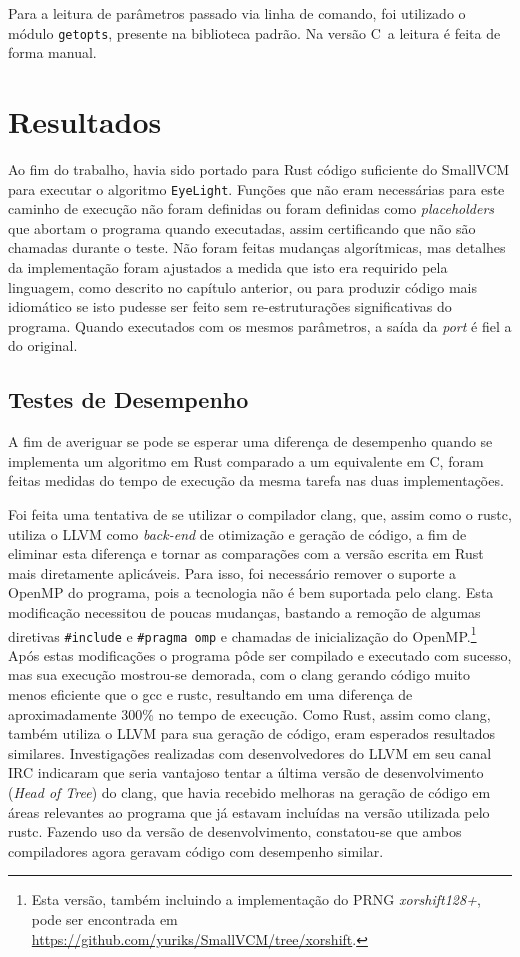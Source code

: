 \documentclass[tg]{mdtufsm}
\def\Cpp{{C\nolinebreak[4]\raisebox{.20ex}{\small\bf++}}}
\begin{document}
Para a leitura de parâmetros passado via linha de comando, foi utilizado o módulo \texttt{getopts}, presente na biblioteca padrão. Na versão \Cpp\ a leitura é feita de forma manual.

\chapter{Resultados}

Ao fim do trabalho, havia sido portado para Rust código suficiente do SmallVCM para executar o algoritmo \texttt{EyeLight}. Funções que não eram necessárias para este caminho de execução não foram definidas ou foram definidas como \emph{placeholders} que abortam o programa quando executadas, assim certificando que não são chamadas durante o teste. Não foram feitas mudanças algorítmicas, mas detalhes da implementação foram ajustados a medida que isto era requirido pela linguagem, como descrito no capítulo anterior, ou para produzir código mais idiomático se isto pudesse ser feito sem re-estruturações significativas do programa. Quando executados com os mesmos parâmetros, a saída da \emph{port} é fiel a do original.

\section{Testes de Desempenho}

A fim de averiguar se pode se esperar uma diferença de desempenho quando se implementa um algoritmo em Rust comparado a um equivalente em \Cpp, foram feitas medidas do tempo de execução da mesma tarefa nas duas implementações.

Foi feita uma tentativa de se utilizar o compilador clang, que, assim como o rustc, utiliza o LLVM como \emph{back-end} de otimização e geração de código, a fim de eliminar esta diferença e tornar as comparações com a versão escrita em Rust mais diretamente aplicáveis. Para isso, foi necessário remover o suporte a OpenMP do programa, pois a tecnologia não é bem suportada pelo clang. Esta modificação necessitou de poucas mudanças, bastando a remoção de algumas diretivas \texttt{\#include} e \texttt{\#pragma omp} e chamadas de inicialização do OpenMP.\footnote{Esta versão, também incluindo a implementação do PRNG \emph{xorshift128+}, pode ser encontrada em \url{https://github.com/yuriks/SmallVCM/tree/xorshift}.} Após estas modificações o programa pôde ser compilado e executado com sucesso, mas sua execução mostrou-se demorada, com o clang gerando código muito menos eficiente que o gcc e rustc, resultando em uma diferença de aproximadamente 300\% no tempo de execução. Como Rust, assim como clang, também utiliza o LLVM para sua geração de código, eram esperados resultados similares. Investigações realizadas com desenvolvedores do LLVM em seu canal IRC indicaram que seria vantajoso tentar a última versão de desenvolvimento (\emph{Head of Tree}) do clang, que havia recebido melhoras na geração de código em áreas relevantes ao programa que já estavam incluídas na versão utilizada pelo rustc. Fazendo uso da versão de desenvolvimento, constatou-se que ambos compiladores agora geravam código com desempenho similar.
\end{document}
